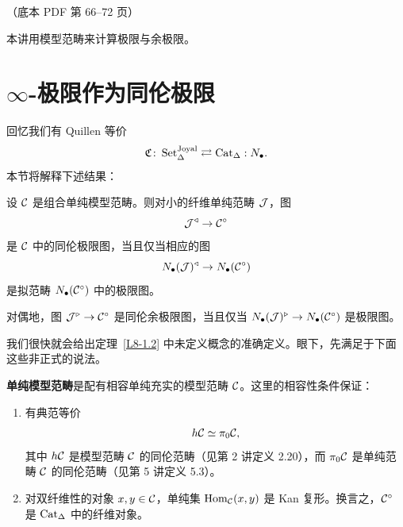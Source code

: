 \begin{center}\small\color{black!55}（底本 PDF 第 66–72 页）\end{center}

本讲用模型范畴来计算极限与余极限。

\section{$\infty$-极限作为同伦极限}

\nitem\label{L8-1.1} 回忆我们有 Quillen 等价
\[
\mathfrak{C}\colon \operatorname{Set}_\Delta^{\mathrm{Joyal}}\rightleftarrows \operatorname{Cat}_\Delta : N_\bullet .
\]
本节将解释下述结果：

\begin{theorem}[HTT.4.2.4.1]\label{L8-1.2}
设 $\mathcal{C}$ 是组合单纯模型范畴。则对小的纤维单纯范畴 $\mathcal{J}$，图
\[
\mathcal{J}^{\triangleleft}\to \mathcal{C}^{\circ}
\]
是 $\mathcal{C}$ 中的同伦极限图，当且仅当相应的图
\[
N_\bullet(\mathcal{J})^{\triangleleft}\to N_\bullet(\mathcal{C}^{\circ})
\]
是拟范畴 $N_\bullet(\mathcal{C}^{\circ})$ 中的极限图。
\end{theorem}

\begin{variant}\label{L8-1.3}
对偶地，图 $\mathcal{J}^{\triangleright}\to \mathcal{C}^{\circ}$ 是同伦余极限图，当且仅当 $N_\bullet(\mathcal{J})^{\triangleright}\to N_\bullet(\mathcal{C}^{\circ})$ 是极限图。
\end{variant}


\nitem\label{L8-1.4} 我们很快就会给出定理~\ref{L8-1.2} 中未定义概念的准确定义。眼下，先满足于下面这些非正式的说法。

\textbf{单纯模型范畴}是配有相容单纯充实的模型范畴 $\mathcal{C}$。这里的相容性条件保证：
\begin{enumerate}[label=(\arabic*),leftmargin=2.4em,itemsep=0.2em]
\item 有典范等价
\[
h\mathcal{C}\simeq \pi_0\mathcal{C},
\]
其中 $h\mathcal{C}$ 是模型范畴 $\mathcal{C}$ 的同伦范畴（见第 2 讲定义 2.20），而 $\pi_0\mathcal{C}$ 是单纯范畴 $\mathcal{C}$ 的同伦范畴（见第 5 讲定义 5.3）。
\item 对双纤维性的对象 $x,y\in\mathcal{C}$，单纯集 $\operatorname{Hom}_{\mathcal{C}}(x,y)$ 是 Kan 复形。换言之，$\mathcal{C}^{\circ}$ 是 $\operatorname{Cat}_\Delta$ 中的纤维对象。
\end{enumerate}

